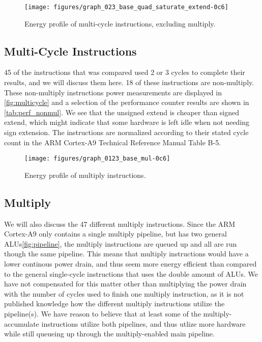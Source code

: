 \begin{figure}
    \centering
    \texttt{[image: figures/graph\_023\_base\_quad\_saturate\_extend-0c6]}
    \caption{Energy profile of multi-cycle instructions, excluding multiply.}
    \label{fig:multicycle}
\end{figure}


\subsection{Multi-Cycle Instructions}


45 of the instructions that was compared used 2 or 3 cycles to complete their
results, and we will discuss them here. 18 of these instructions are
non-multiply.  These non-multiply instructions power measurements are displayed
in \autoref{fig:multicycle} and a selection of the performance counter results
are shown in \autoref{tab:perf_nonmul}. We see that the unsigned extend is
cheaper than signed extend, which might indicate that some hardware is left idle
when not needing sign extension. The instructions are normalized according to
their stated cycle count in the ARM Cortex-A9 Technical Reference Manual Table
B-5\cite{armtech}.

\begin{figure*}
    \centering
    \texttt{[image: figures/graph\_0123\_base\_mul-0c6]}
    \caption{Energy profile of multiply instructions.}
    \label{fig:allmul}
\end{figure*}

\subsection{Multiply}
We will also discuss the 47 different multiply instructions. Since the ARM
Cortex-A9 only contains a single multiply pipeline, but has two general
ALUs\ref{fig:pipeline}, the multiply instructions are queued up and all are run
though the same pipeline. This means that multiply instructions would have a
lower continous power drain, and thus seem more energy efficient than compared
to the general single-cycle instructions that uses the double amount of ALUs. We
have not compensated for this matter other than multiplying the power drain with
the number of cycles used to finish one multiply instruction, as it is not
published knowledge how the different multiply instructions utilize the
pipeline(s). We have reason to believe that at least some of the
multiply-accumulate instructions utilize both pipelines\cite{ramangcc}, and thus
utlize more hardware while still queueing up through the multiply-enabled main
pipeline.

